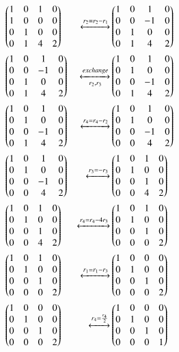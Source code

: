\documentclass[journal,12pt,twocolumn]{IEEEtran}
\begin{document}
\begin{align}
& \begin{pmatrix}1 & 0 & 1 & 0 \\ 1 & 0 & 0 & 0 \\ 0 & 1 & 0 & 0 \\ 0 & 1 & 4 & 2\end{pmatrix} &  \xleftrightarrow[]{r_2=r_2-r_1} &
\begin{pmatrix}1 & 0 & 1 & 0 \\ 0 & 0 & -1 & 0 \\ 0 & 1 & 0 & 0 \\ 0 & 1 & 4 & 2\end{pmatrix} \\
& \begin{pmatrix}1 & 0 & 1 & 0 \\ 0 & 0 & -1 & 0 \\ 0 & 1 & 0 & 0 \\ 0 & 1 & 4 &2\end{pmatrix}      &\xleftrightarrow[r_2,r_3]{exchange}&                                                              \begin{pmatrix}1 & 0 & 1 & 0 \\ 0 & 1 & 0 & 0 \\ 0 & 0 & -1 & 0 \\0&1&4& 2\end{pmatrix} \\
& \begin{pmatrix}1 & 0 & 1 & 0 \\ 0 & 1 & 0 & 0 \\ 0 & 0 & -1 & 0 \\0 & 1 & 4 & 2\end{pmatrix}&\xleftrightarrow[]{r_4=r_4-r_2}&
\begin{pmatrix}1 & 0 & 1 & 0 \\ 0 & 1 & 0 & 0 \\ 0 & 0 & -1 & 0 \\0 & 0 & 4 & 2\end{pmatrix} \\
& \begin{pmatrix}1 & 0 & 1 & 0 \\ 0 & 1 & 0 & 0 \\ 0 & 0 & -1 & 0 \\0 & 0 & 4 & 2\end{pmatrix}&\xleftrightarrow[]{r_3=-r_3}&
\begin{pmatrix}1 & 0 & 1 & 0 \\ 0 & 1 & 0 & 0 \\ 0 & 0 & 1 & 0 \\0 & 0 & 4 & 2\end{pmatrix} \\
& \begin{pmatrix}1 & 0 & 1 & 0 \\ 0 & 1 & 0 & 0 \\ 0 & 0 & 1 & 0 \\0 & 0 & 4 & 2\end{pmatrix} &\xleftrightarrow[]{r_4=r_4-4r_3}& \begin{pmatrix}1 & 0 & 1 & 0 \\ 0 & 1 & 0 & 0 \\ 0 & 0 & 1 & 0 \\0& 0& 0&2\end{pmatrix} \\ 
&\begin{pmatrix}1 & 0 & 1 & 0 \\ 0 & 1 & 0 & 0 \\ 0 & 0 & 1 & 0 \\0& 0& 0&2\end{pmatrix}&\xleftrightarrow[]{r_1=r_1-r_3}&
\begin{pmatrix}1 & 0 & 0 & 0 \\ 0 & 1 & 0 & 0 \\ 0 & 0 & 1 & 0 \\0& 0& 0&2\end{pmatrix}\\
& \begin{pmatrix}1 & 0 & 0 & 0 \\ 0 & 1 & 0 & 0 \\ 0 & 0 & 1 & 0 \\0& 0& 0&2\end{pmatrix} &\xleftrightarrow[]{r_4=\frac{r_4}{2}}& \begin{pmatrix}1 & 0 & 0 & 0 \\ 0 & 1 & 0 & 0 \\ 0 & 0 & 1 & 0 \\0& 0& 0&1\end{pmatrix}\label{2}
\end{align}
\end{document}
